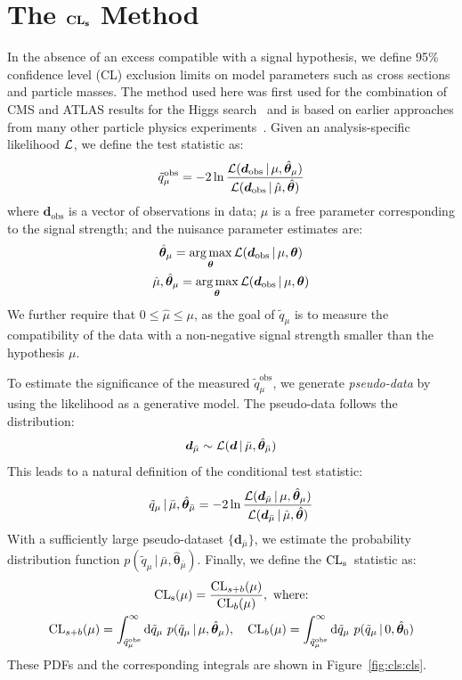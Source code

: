 \chapter{The $\mathbf{\text{{\bf CL}}_s}$ Method}
\label{sec:cls}

In the absence of an excess compatible with a signal hypothesis, we define 95\% confidence level (CL) exclusion limits on model parameters such as cross sections and particle masses.
The method used here was first used for the combination of CMS and ATLAS results for the Higgs search~\cite{cls1} and is based on earlier approaches from many other particle physics experiments~\cite{cls2,cls3}.
Given an analysis-specific likelihood $\mathcal{L}$, we define the test statistic as:
\begin{equation}
    \tilde q_\mu^\mathrm{obs} = -2\ln \frac{\mathcal{L}(\bm{d}_\mathrm{obs} \,|\, \mu,\hat{\bm{\theta}}_\mu)}{\mathcal{L}(\bm{d}_\mathrm{obs} \,|\, \hat\mu,\hat{\bm{\theta}})}
\end{equation}
where $\bm{d}_\mathrm{obs}$ is a vector of observations in data; $\mu$ is a free parameter corresponding to the signal strength; and the nuisance parameter estimates are:
\begin{gather}
    \hat{\bm{\theta}}_\mu = \operatorname*{arg\,max}_{\bm{\theta}} \mathcal{L}(\bm{d}_\mathrm{obs}\,|\,\mu,\bm{\theta}) \nonumber \\
    \hat\mu, \hat{\bm{\theta}}_\mu = \operatorname*{arg\,max}_{\bm{\theta}} \mathcal{L}(\bm{d}_\mathrm{obs}\,|\,\mu,\bm{\theta}) 
\end{gather}
We further require that $0 \leq \hat\mu \leq \mu$, as the goal of $\tilde q _\mu$ is to measure the compatibility of the data with a non-negative signal strength smaller than the hypothesis $\mu$.

To estimate the significance of the measured $\tilde q^\mathrm{obs}_\mu$, we generate \emph{pseudo-data} by using the likelihood as a generative model.
The pseudo-data follows the distribution:
\begin{equation}
    \bm{d}_{\bar\mu} \sim \mathcal{L}(\bm d\,|\,\bar\mu, \hat{\bm{\theta}}_{\bar\mu})
\end{equation}
This leads to a natural definition of the conditional test statistic:
\begin{equation}
    \tilde q_{\mu}\,|\,{\bar\mu},\hat{\bm\theta}_{\bar\mu} = -2\ln \frac{\mathcal{L}(\bm{d}_{\bar\mu} \,|\, {\mu},\hat{\bm{\theta}}_{\mu})}{\mathcal{L}(\bm{d}_{\bar\mu} \,|\, \hat{\mu},\hat{\bm{\theta}})}
\end{equation}
With a sufficiently large pseudo-dataset $\{\bm{d}_{\bar\mu}\}$, we estimate the probability distribution function $p(\tilde q_{\mu}\,|\,{\bar\mu},\hat{\bm{\theta}}_{\bar\mu})$.
Finally, we define the $\operatorname{\mathrm{CL}_s}$~statistic as:
\begin{gather}
    \operatorname{\mathrm{CL}_s}(\mu) = \frac{\mathrm{CL}_{s+b}(\mu)}{\mathrm{CL}_b(\mu)},~\text{where:} \nonumber \\ 
    \mathrm{CL}_{s+b}(\mu) = \int_{\tilde q_\mu^\mathrm{obs}}^\infty \mathrm{d} \tilde q_{\mu}~p(\tilde q_\mu\,|\,\mu,\hat{\bm{\theta}}_\mu), \quad
    \mathrm{CL}_b(\mu) = \int_{\tilde q_\mu^\mathrm{obs}}^\infty \mathrm{d} \tilde q_{\mu}~p(\tilde q_\mu\,|\,0,\hat{\bm{\theta}}_0)
\end{gather}
These PDFs and the corresponding integrals are shown in Figure~\ref{fig:cls:cls}.

